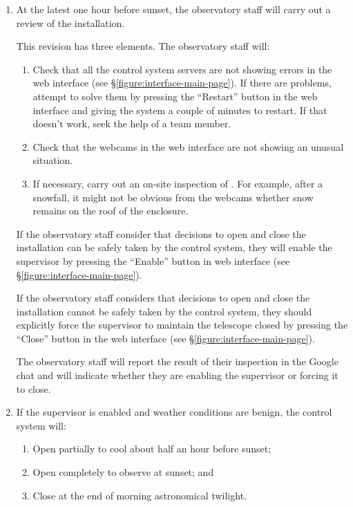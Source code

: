 \begin{enumerate}

    \item At the latest one hour before sunset, the observatory staff will carry out a review of the {\projectname} installation.

        This revision has three elements. The observatory staff will:

        \begin{enumerate}
            \item
                Check that all the control system servers are not showing errors in the web interface (see \S\ref{figure:interface-main-page}). If there are problems, attempt to solve them by pressing the “Restart” button in the web interface and giving the system a couple of minutes to restart. If that doesn't work, seek the help of a team member.
            \item
                Check that the webcams in the web interface are not showing an unusual situation.
            \item
                If necessary, carry out an on-site inspection of {\projectname}. For example, after a snowfall, it might not be obvious from the webcams whether snow remains on the roof of the enclosure.
        \end{enumerate}

        If the observatory staff consider that decisions to open and close the installation can be safely taken by the control system, they will enable the supervisor by pressing the “Enable” button in web interface (see \S\ref{figure:interface-main-page}).

        If the observatory staff considers that decisions to open and close the installation cannot be safely taken by the control system, they should explicitly force the supervisor to maintain the telescope closed by pressing the “Close” button in  the web interface (see \S\ref{figure:interface-main-page}).

        The observatory staff will report the result of their inspection in the Google chat and will indicate whether they are enabling the supervisor or forcing it to close.

    \item
        If the supervisor is enabled and weather conditions are benign, the control system will:
        \begin{enumerate}
            \item
                Open partially to cool about half an hour before sunset;
            \item
                Open completely to observe at sunset; and
            \item
                Close at the end of morning astronomical twilight.
        \end{enumerate}


\end{enumerate}

